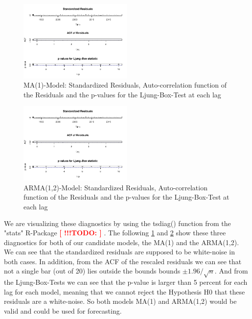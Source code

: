 \documentclass[11pt,a4paper]{article}
\newcommand{\TODO}[1]{%
    \textcolor{red}{ %
        \textbf{[ !!!TODO: #1 ]}%
    }%
    \PackageWarning{TODO:}{TODO: #1}%
}
\begin{document}
\begin{figure}
    \centering
    \includegraphics[width=0.5\textwidth]{ts_diag_ma_1}
    \caption{MA(1)-Model: Standardized Residuals, Auto-correlation function of the Residuals and the p-values for the Ljung-Box-Test at each lag}
    \label{fig:ts_diag_ma_1}
\end{figure}
\begin{figure}
    \centering
    \includegraphics[width=0.5\textwidth]{ts_diag_arma_1_2}
    \caption{ARMA(1,2)-Model: Standardized Residuals, Auto-correlation function of the Residuals and the p-values for the Ljung-Box-Test at each lag}
    \label{fig:ts_diag_arma_1_2}
\end{figure}

We are visualizing these diagnostics by using the tsdiag() function from the "stats" R-Package \TODO{}.
The following \cref{fig:ts_diag_ma_1} and \cref{fig:ts_diag_arma_1_2} show these three diagnostics for both of our candidate models, the MA(1) and the ARMA(1,2).
We can see that the standardized residuals are supposed to be white-noise in both cases.
In addition, from the ACF of the rescaled residuals we can see that not a single bar (out of 20) lies outside the bounds bounds $\pm 1.96 / \sqrt{n}$.
And from the Ljung-Box-Tests we can see that the p-value is larger than 5 percent for each lag for each model, meaning that we cannot reject the Hypothesis H0 that these residuals are a white-noise. So both models MA(1) and ARMA(1,2) would be valid and could be used for forecasting.


\end{document}
